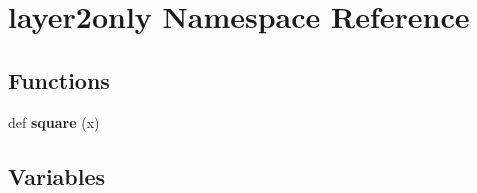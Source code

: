 \hypertarget{namespacelayer2only}{}\section{layer2only Namespace Reference}
\label{namespacelayer2only}
\subsection*{Functions}
\begin{DoxyCompactItemize}
\item 
\mbox{\label{namespacelayer2only_ae8b36c3cc4f176f8d80cbbfd1e9cf0c3}} 
def {\bfseries square} (x)
\end{DoxyCompactItemize}
\subsection*{Variables}
